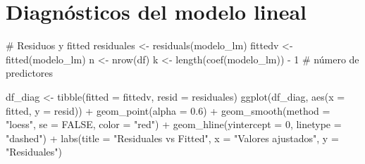 \documentclass[
  spanish,
  11pt,
  a4paper,
  DIV=11,
  numbers=noendperiod]{scrartcl}
\newenvironment{Shaded}{\begin{snugshade}}{\end{snugshade}}
\newcommand{\AttributeTok}[1]{\textcolor[rgb]{0.40,0.45,0.13}{#1}}
\newcommand{\CommentTok}[1]{\textcolor[rgb]{0.37,0.37,0.37}{#1}}
\newcommand{\ConstantTok}[1]{\textcolor[rgb]{0.56,0.35,0.01}{#1}}
\newcommand{\DecValTok}[1]{\textcolor[rgb]{0.68,0.00,0.00}{#1}}
\newcommand{\FloatTok}[1]{\textcolor[rgb]{0.68,0.00,0.00}{#1}}
\newcommand{\FunctionTok}[1]{\textcolor[rgb]{0.28,0.35,0.67}{#1}}
\newcommand{\NormalTok}[1]{\textcolor[rgb]{0.00,0.23,0.31}{#1}}
\newcommand{\OtherTok}[1]{\textcolor[rgb]{0.00,0.23,0.31}{#1}}
\newcommand{\SpecialCharTok}[1]{\textcolor[rgb]{0.37,0.37,0.37}{#1}}
\newcommand{\StringTok}[1]{\textcolor[rgb]{0.13,0.47,0.30}{#1}}
\begin{document}
\section{Diagnósticos del modelo
lineal}\label{diagnuxf3sticos-del-modelo-lineal}

\begin{Shaded}
\begin{Highlighting}[numbers=left,,]
\CommentTok{\# Residuos y fitted}
\NormalTok{residuales }\OtherTok{\textless{}{-}} \FunctionTok{residuals}\NormalTok{(modelo\_lm)}
\NormalTok{fittedv    }\OtherTok{\textless{}{-}} \FunctionTok{fitted}\NormalTok{(modelo\_lm)}
\NormalTok{n }\OtherTok{\textless{}{-}} \FunctionTok{nrow}\NormalTok{(df)}
\NormalTok{k }\OtherTok{\textless{}{-}} \FunctionTok{length}\NormalTok{(}\FunctionTok{coef}\NormalTok{(modelo\_lm)) }\SpecialCharTok{{-}} \DecValTok{1}  \CommentTok{\# número de predictores}


\NormalTok{df\_diag }\OtherTok{\textless{}{-}} \FunctionTok{tibble}\NormalTok{(}\AttributeTok{fitted =}\NormalTok{ fittedv, }\AttributeTok{resid =}\NormalTok{ residuales)}
\FunctionTok{ggplot}\NormalTok{(df\_diag, }\FunctionTok{aes}\NormalTok{(}\AttributeTok{x =}\NormalTok{ fitted, }\AttributeTok{y =}\NormalTok{ resid)) }\SpecialCharTok{+}
  \FunctionTok{geom\_point}\NormalTok{(}\AttributeTok{alpha =} \FloatTok{0.6}\NormalTok{) }\SpecialCharTok{+}
  \FunctionTok{geom\_smooth}\NormalTok{(}\AttributeTok{method =} \StringTok{"loess"}\NormalTok{, }\AttributeTok{se =} \ConstantTok{FALSE}\NormalTok{, }\AttributeTok{color =} \StringTok{"red"}\NormalTok{) }\SpecialCharTok{+}
  \FunctionTok{geom\_hline}\NormalTok{(}\AttributeTok{yintercept =} \DecValTok{0}\NormalTok{, }\AttributeTok{linetype =} \StringTok{"dashed"}\NormalTok{) }\SpecialCharTok{+}
  \FunctionTok{labs}\NormalTok{(}\AttributeTok{title =} \StringTok{"Residuales vs Fitted"}\NormalTok{, }\AttributeTok{x =} \StringTok{"Valores ajustados"}\NormalTok{, }
       \AttributeTok{y =} \StringTok{"Residuales"}\NormalTok{)}
\end{Highlighting}
\end{Shaded}
\end{document}
